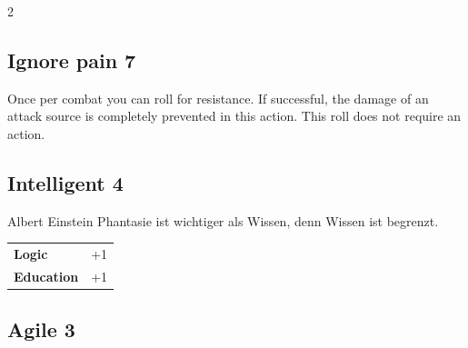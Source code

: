 \begin{multicols}{2}
\begin{tcolorbox}
\vspace{3mm}



\end{tcolorbox}

\begin{tcolorbox}
    \subsection*{Ignore pain \hfill \small{7 }}
    \tcblower
Once per combat you can roll for resistance. If successful, the damage of an attack source is completely prevented in this action. This roll does not require an action.


\vspace{3mm}



\end{tcolorbox}

\begin{tcolorbox}
    \subsection*{Intelligent \hfill \small{4 }}
    \tcblower


\begin{pquote}{Albert Einstein}
Phantasie ist wichtiger als Wissen, denn Wissen ist begrenzt.
\end{pquote}

\vspace{3mm}

\begin{tabular}{@{}ll@{}}
    \textbf{Logic} & +1\\
    \textbf{Education} & +1\\
\end{tabular}


\end{tcolorbox}

\begin{tcolorbox}
    \subsection*{Agile \hfill \small{3 }}
    \tcblower





\end{tcolorbox}
\end{multicols}
